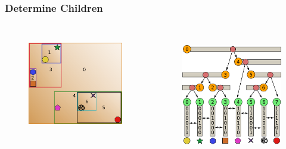 \documentclass{beamer}
\begin{document}
\begin{frame}
  \frametitle{Determine Children}
  
\begin{columns}[t]

\begin{figure}
\includegraphics[height=45mm]{primitive-box.png}
\end{figure}

\begin{figure}
\includegraphics[height=55mm]{algo_4.png}
\end{figure}
\end{columns}
\end{frame}
\end{document}
